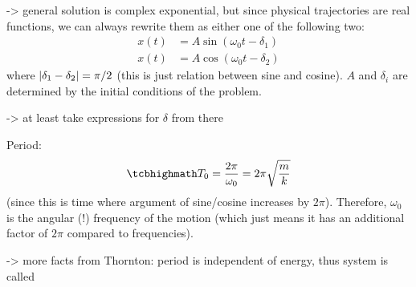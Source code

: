 \documentclass[../class_mech_main.tex]{subfiles}
\begin{document}
-> general solution is complex exponential, but since physical trajectories are real functions, we can always rewrite them as either one of the following two:
\begin{subequations}
	\begin{align}
		x(t) &= A \sin(\omega_0 t - \delta_1)
		\\
		x(t) &= A \cos(\omega_0 t - \delta_2)
	\end{align}
\end{subequations}
where $\abs{\delta_1 - \delta_2} = \pi/2$ (this is just relation between sine and cosine). $A$ and $\delta_i$ are determined by the initial conditions of the problem.

 -> at least take expressions for $\delta$ from there



Period:
\begin{equation}
	\eqbox{
		T_0 = \frac{2\pi}{\omega_0} = 2\pi \sqrt{\frac{m}{k}}
	}
\end{equation}
(since this is time where argument of sine/cosine increases by $2\pi$). Therefore, $\omega_0$ is the angular (!) frequency of the motion (which just means it has an additional factor of $2\pi$ compared to frequencies).

-> more facts from Thornton: period is independent of energy, thus system is called 
\end{document}
